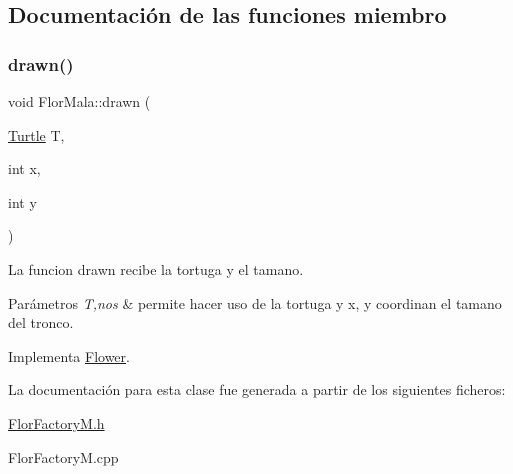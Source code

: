 \subsection{Documentación de las funciones miembro}
\mbox{\label{classFlorMala_aee0f20f3aa80d9ce3cb9c6fdbf036a7c}} 
\subsubsection{\texorpdfstring{drawn()}{drawn()}}
{\footnotesize\ttfamily void Flor\+Mala\+::drawn (\begin{DoxyParamCaption}\item[{\hyperlink{classTurtle}{Turtle}}]{T,  }\item[{int}]{x,  }\item[{int}]{y }\end{DoxyParamCaption})\hspace{0.3cm}{\ttfamily [virtual]}}

La funcion drawn recibe la tortuga y el tamano. 
\begin{DoxyParams}{Parámetros}
{\em T,nos} & permite hacer uso de la tortuga y x, y coordinan el tamano del tronco. \\
\hline
\end{DoxyParams}


Implementa \hyperlink{classFlower_af01eea570f9d02e16cda1d86ee97633c}{Flower}.



La documentación para esta clase fue generada a partir de los siguientes ficheros\+:\begin{DoxyCompactItemize}
\item 
\hyperlink{FlorFactoryM_8h}{Flor\+Factory\+M.\+h}\item 
Flor\+Factory\+M.\+cpp\end{DoxyCompactItemize}
